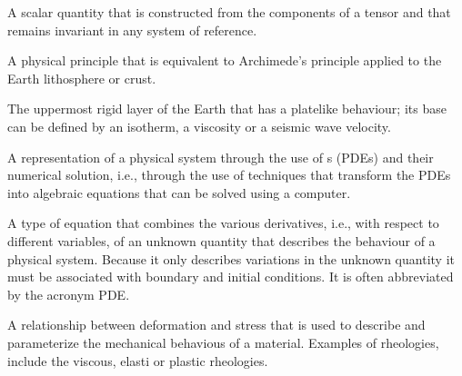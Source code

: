 \documentclass[letterpaper,10pt,english]{jupyterBook}
\begin{document}
\begin{description}
\sphinxAtStartPar
A scalar quantity that is constructed from the components of a tensor and that remains invariant in any system of reference.

\sphinxAtStartPar
A physical principle that is equivalent to Archimede’s principle applied to the Earth lithosphere or crust.

\sphinxAtStartPar
The uppermost rigid layer of the Earth that has a plate\sphinxhyphen{}like behaviour; its base can be defined by an isotherm, a viscosity or a seismic wave velocity.

\sphinxAtStartPar
A representation of a physical system through the use of {\hyperref[\detokenize{glossary:term-Partial-differential-equation}]{}}s (PDEs) and their numerical solution, i.e., through the use of techniques that transform the PDEs into algebraic equations that can be solved using a computer.

\sphinxAtStartPar
A type of equation that combines the various derivatives, i.e., with respect to different variables, of an unknown quantity that describes the behaviour of a physical system. Because it only describes variations in the unknown quantity it must be associated with boundary and initial conditions. It is often abbreviated by the acronym PDE.

\sphinxAtStartPar
A relationship between deformation and stress that is used to describe and parameterize the mechanical behavious of a material. Examples of rheologies, include the viscous, elasti or plastic rheologies.

\end{description}
\end{document}
